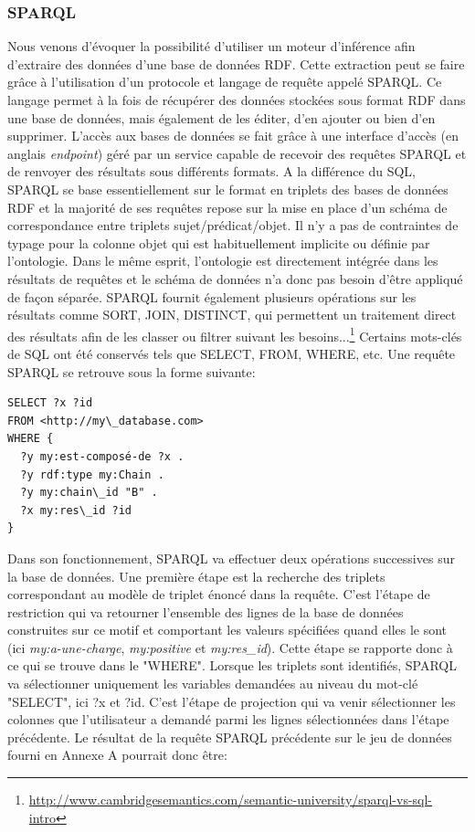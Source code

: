 \subsubsection{SPARQL} \label{sparql}

Nous venons d'évoquer la possibilité d'utiliser un moteur d'inférence afin d'extraire des données d'une base de données RDF. Cette extraction peut se faire grâce à l'utilisation d'un protocole et langage de requête appelé SPARQL. Ce langage permet à la fois de récupérer des données stockées sous format RDF dans une base de données, mais également de les éditer, d'en ajouter ou bien d'en supprimer. L'accès aux bases de données se fait grâce à une interface d'accès (en anglais \textit{endpoint}) géré par un service capable de recevoir des requêtes SPARQL et de renvoyer des résultats sous différents formats.
A la différence du SQL, SPARQL se base essentiellement sur le format en triplets des bases de données RDF et la majorité de ses requêtes repose sur la mise en place d'un schéma de correspondance entre triplets sujet/prédicat/objet. Il n'y a pas de contraintes de typage pour la colonne objet qui est habituellement implicite ou définie par l'ontologie. Dans le même esprit, l'ontologie est directement intégrée dans les résultats de requêtes et le schéma de données n'a donc pas besoin d'être appliqué de façon séparée. SPARQL fournit également plusieurs opérations sur les résultats comme SORT, JOIN, DISTINCT, qui permettent un traitement direct des résultats afin de les classer ou filtrer suivant les besoins...\footnote{\url{http://www.cambridgesemantics.com/semantic-university/sparql-vs-sql-intro}} Certains mots-clés de SQL ont été conservés tels que SELECT, FROM, WHERE, etc.
Une requête SPARQL se retrouve sous la forme suivante:

\begin{lstlisting}[language=SPARQL]
SELECT ?x ?id
FROM <http://my\_database.com> 
WHERE {
  ?y my:est-composé-de ?x .
  ?y rdf:type my:Chain .
  ?y my:chain\_id "B" .
  ?x my:res\_id ?id
}
\end{lstlisting}

Dans son fonctionnement, SPARQL va effectuer deux opérations successives sur la base de données. Une première étape est la recherche des triplets correspondant au modèle de triplet énoncé dans la requête. C'est l'étape de restriction qui va retourner l'ensemble des lignes de la base de données construites sur ce motif et comportant les valeurs spécifiées quand elles le sont (ici \textit{my:a-une-charge}, \textit{my:positive} et \textit{my:res\_id}). Cette étape se rapporte donc à ce qui se trouve dans le "WHERE". Lorsque les triplets sont identifiés, SPARQL va sélectionner uniquement les variables demandées au niveau du mot-clé "SELECT", ici ?x et ?id. C'est l'étape de projection qui va venir sélectionner les colonnes que l'utilisateur a demandé parmi les lignes sélectionnées dans l'étape précédente. Le résultat de la requête SPARQL précédente sur le jeu de données fourni en Annexe A pourrait donc être:

